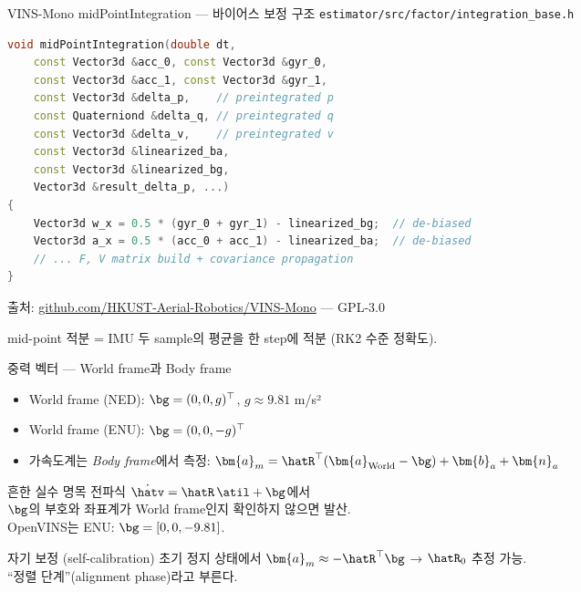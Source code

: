 \begin{frame}[fragile]{VINS-Mono midPointIntegration — 바이어스 보정 구조}
  \texttt{estimator/src/factor/integration\_base.h}
\begin{lstlisting}[language=C++, basicstyle=\ttfamily\tiny]
void midPointIntegration(double dt,
    const Vector3d &acc_0, const Vector3d &gyr_0,
    const Vector3d &acc_1, const Vector3d &gyr_1,
    const Vector3d &delta_p,    // preintegrated p
    const Quaterniond &delta_q, // preintegrated q
    const Vector3d &delta_v,    // preintegrated v
    const Vector3d &linearized_ba,
    const Vector3d &linearized_bg,
    Vector3d &result_delta_p, ...)
{
    Vector3d w_x = 0.5 * (gyr_0 + gyr_1) - linearized_bg;  // de-biased
    Vector3d a_x = 0.5 * (acc_0 + acc_1) - linearized_ba;  // de-biased
    // ... F, V matrix build + covariance propagation
}
\end{lstlisting}
  {\footnotesize 출처: \url{github.com/HKUST-Aerial-Robotics/VINS-Mono} — GPL-3.0}
  \vspace{0.1em}

  mid-point 적분 = IMU 두 sample의 평균을 한 step에 적분 (RK2 수준 정확도).
\end{frame}

\begin{frame}{중력 벡터 — World frame과 Body frame}
  \begin{itemize}
    \item World frame (NED): $\bg = (0, 0, g)^\top$, $g \approx 9.81$ m/s²
    \item World frame (ENU): $\bg = (0, 0, -g)^\top$
    \item 가속도계는 \emph{Body frame}에서 측정:
      $\bm{a}_m = \hatR^\top(\bm{a}_\text{World} - \bg) + \bm{b}_a + \bm{n}_a$
  \end{itemize}
  \pause
  \vspace{0.3em}
  \begin{alertblock}{흔한 실수}
    명목 전파식 $\dot{\hatv} = \hatR\,\atil + \bg$에서 \\
    $\bg$의 부호와 좌표계가 World frame인지 확인하지 않으면 발산.\\
    OpenVINS는 ENU: $\bg = [0,0,-9.81]$.
  \end{alertblock}
  \pause
  \vspace{0.2em}
  \begin{block}{자기 보정 (self-calibration)}
    초기 정지 상태에서 $\bm{a}_m \approx -\hatR^\top\bg$ → $\hatR_0$ 추정 가능.\\
    ``정렬 단계''(alignment phase)라고 부른다.
  \end{block}
\end{frame}

